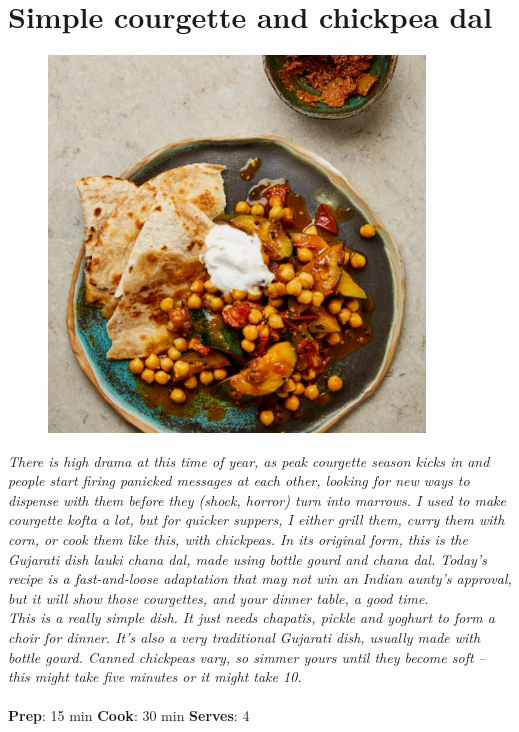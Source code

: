 \documentclass{book}
\begin{document}
\section{Simple courgette and chickpea dal}
\begin{figure}
\centering\includegraphics[width=10cm,height=10cm,keepaspectratio]{Recipe_Pictures/Simple_courgette_and_chickpea_dal.png}
\end{figure}
\emph{There is high drama at this time of year, as peak courgette season kicks in and people start firing panicked messages at each other, looking for new ways to dispense with them before they (shock, horror) turn into marrows. I used to make courgette kofta a lot, but for quicker suppers, I either grill them, curry them with corn, or cook them like this, with chickpeas. In its original form, this is the Gujarati dish lauki chana dal, made using bottle gourd and chana dal. Today’s recipe is a fast-and-loose adaptation that may not win an Indian aunty’s approval, but it will show those courgettes, and your dinner table, a good time.\\ 
This is a really simple dish. It just needs chapatis, pickle and yoghurt to form a choir for dinner. It’s also a very traditional Gujarati dish, usually made with bottle gourd. Canned chickpeas vary, so simmer yours until they become soft – this might take five minutes or it might take 10.}\\\\ 
\textbf{Prep}: 15 min
\textbf{Cook}: 30 min
\textbf{Serves}: 4
\end{document}
